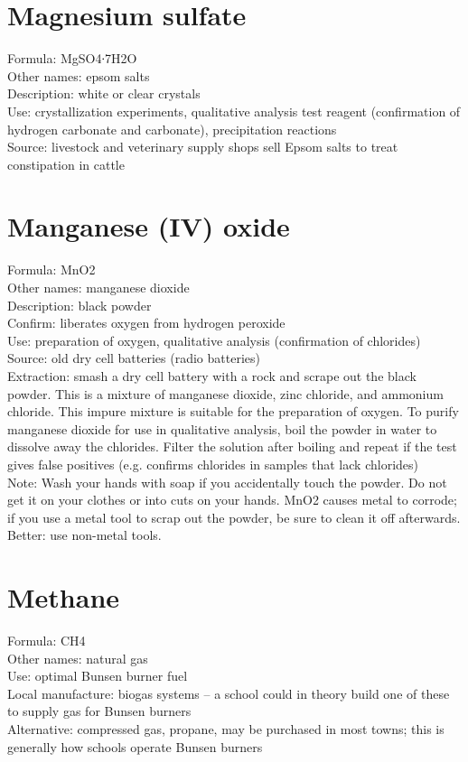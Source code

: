 \section{Magnesium sulfate}
Formula: MgSO4∙7H2O\\
Other names: epsom salts\\
Description: white or clear crystals\\
Use: crystallization experiments, 
qualitative analysis test reagent 
(confirmation of hydrogen carbonate and carbonate), 
precipitation reactions\\
Source: livestock and veterinary supply shops sell Epsom salts 
to treat constipation in cattle

\section{Manganese (IV) oxide}
Formula: MnO2\\
Other names: manganese dioxide\\
Description: black powder\\
Confirm: liberates oxygen from hydrogen peroxide\\
Use: preparation of oxygen, 
qualitative analysis (confirmation of chlorides)\\
Source: old dry cell batteries (radio batteries)\\
Extraction: smash a dry cell battery with a rock 
and scrape out the black powder. 
This is a mixture of manganese dioxide, 
zinc chloride, 
and ammonium chloride. 
This impure mixture is suitable for the preparation of oxygen. 
To purify manganese dioxide for use in qualitative analysis, 
boil the powder in water to dissolve away the chlorides. 
Filter the solution after boiling 
and repeat if the test gives false positives (e.g. 
confirms chlorides in samples that lack chlorides)\\
Note: Wash your hands with soap if you accidentally touch the powder. 
Do not get it on your clothes or into cuts on your hands. 
MnO2 causes metal to corrode; 
if you use a metal tool to scrap out the powder, 
be sure to clean it off afterwards. 
Better: use non-metal tools. 

\section{Methane}
Formula: CH4\\
Other names: natural gas\\
Use: optimal Bunsen burner fuel\\
Local manufacture: biogas systems – 
a school could in theory build one of these to supply gas for Bunsen burners\\
Alternative: compressed gas, 
propane, 
may be purchased in most towns; 
this is generally how schools operate Bunsen burners

